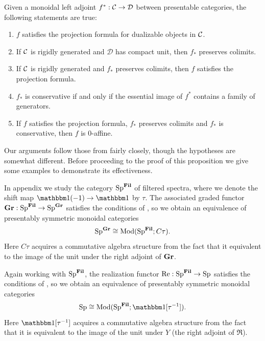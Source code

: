 \begin{prop} \label{prop:rigid}
  Given a monoidal left adjoint $f^* : \mathcal{C} \to \mathcal{D}$ between presentable categories, the following statements are true:
  \begin{enumerate}
  \item $f$ satisfies the projection formula for dualizable objects in $\mathcal{C}$.
  \item If $\mathcal{C}$ is rigidly generated and $\mathcal{D}$ has compact unit, then $f_*$ preserves colimits.
  \item If $\mathcal{C}$ is rigidly generated  and $f_*$ preserves colimits, then $f$ satisfies the projection formula.
  \item $f_*$ is conservative if and only if the essential image of $f^*$ contains a family of generators.
  \item If $f$ satisfies the projection formula, $f_*$ preserves colimits and $f_*$ is conservative, then $f$ is $0$-affine.
  \end{enumerate}
\end{prop}

Our arguments follow those from \cite{MNN} fairly closely, though the hypotheses are somewhat different.  Before proceeding to the proof of this proposition we give some examples to demonstrate its effectiveness.



\begin{exm} \label{exm:fil-ctau}
In appendix  we study the category $\operatorname{\mathrm{Sp}}^{\operatorname{\mathbf{Fil}}}$ of filtered spectra, where we denote the shift map $\o(-1) \to \o$ by $\tau$.
  The associated graded functor $\operatorname{\mathbf{Gr}} : \operatorname{\mathrm{Sp}}^{\operatorname{\mathbf{Fil}}} \to \operatorname{\mathrm{Sp}}^{\operatorname{\mathbf{Gr}}}$ satisfies the conditions of , so we obtain an equivalence of presentably symmetric monoidal categories
  \[ \operatorname{\mathrm{Sp}}^{\operatorname{\mathbf{Gr}}} \cong \mathrm{Mod} ( \operatorname{\mathrm{Sp}}^{\operatorname{\mathbf{Fil}}} ; C\tau ). \]
  Here $C\tau$ acquires a commutative algebra structure from the fact that it equivalent to the image of the unit under the right adjoint of $\operatorname{\mathbf{Gr}}$.
\end{exm}

\begin{exm} \label{exm:fil-inv-tau}
  Again working with $\operatorname{\mathrm{Sp}}^{\operatorname{\mathbf{Fil}}}$,
  the realization functor $\mathrm{Re} : \operatorname{\mathrm{Sp}}^{\operatorname{\mathbf{Fil}}} \to \operatorname{\mathrm{Sp}}$ satisfies the conditions of , so we obtain an equivalence of presentably symmetric monoidal categories
  \[ \Sp \cong \Mod ( \Sp^{\Fil} ; \o[\tau^{-1}] ). \]
  Here $\o[\tau^{-1}]$ acquires a commutative algebra structure from the fact that it is equivalent to the image of the unit under $Y$ (the right adjoint of $\Re$).
\end{exm}

